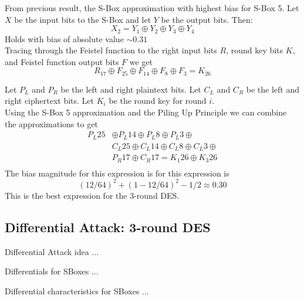 \documentclass[9pt]{beamer}
\begin{document}
\begin{frame}
From previous result, the S-Box approximation with highest bias for S-Box 5. Let $X$ be the input bits to the S-Box and let $Y$ be the output bits. Then:
\[ X_{2} = Y_{1} \oplus Y_{2} \oplus Y_{3} \oplus Y_{4} \]
Holds with bias of absolute value $\sim 0.31$\\
\vspace{5mm}
Tracing through the Feistel function to the right input bits $R$, round key bits $K$, and Feistel function output bits $F$ we get
\[ R_{17} \oplus F_{25} \oplus F_{14} \oplus F_{8} \oplus F_{3} = K_{26} \]

\end{frame}

\begin{frame}
Let $P_L$ and $P_R$ be the left and right plaintext bits. Let $C_L$ and $C_R$ be the left and right ciphertext bits. Let $K_i$ be the round key for round $i$. \\
\vspace{5mm}
Using the S-Box 5 approximation and the Piling Up Principle we can combine the approximations to get
\begin{align*}
 P_L{25} & \oplus P_L{14} \oplus P_L{8} \oplus P_L{3} \oplus \\
         & C_L{25} \oplus C_L{14} \oplus C_L{8} \oplus C_L{3} \oplus \\
			& P_R{17} \oplus C_R{17} = K_1{26} \oplus K_3{26} \\
\end{align*}
The bias magnitude for this expression is for this expression is 
\[ (12/64)^2 + (1 - 12/64)^2 - 1/2 \approx 0.30 \]
This is the best expression for the 3-round DES.
\end{frame}

\subsection{Differential Attack: 3-round DES}
\begin{frame}
Differential Attack idea ...

\end{frame}

\begin{frame}
Differentials for SBoxes ...

\end{frame}

\begin{frame}
Differential characteristics for SBoxes ...

\end{frame}
\end{document}
